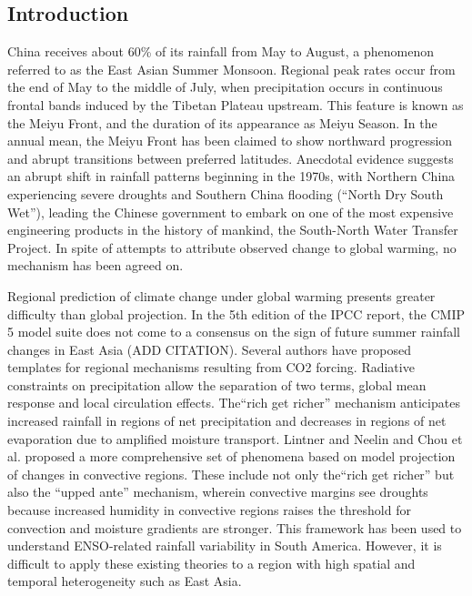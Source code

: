 \documentclass[draft,grl]{AGUTeX}
\begin{document}
\begin{article}



\section{Introduction}
China receives about 60\% of its rainfall from May to August, a phenomenon referred to as the East Asian Summer Monsoon. Regional peak rates occur from the end of May to the middle of July, when precipitation occurs in continuous frontal bands induced by the Tibetan Plateau upstream. This feature is known as the Meiyu Front, and the duration of its appearance as Meiyu Season. In the annual mean, the Meiyu Front has been claimed to show northward progression and abrupt transitions between preferred latitudes\citep{Ding2005}. Anecdotal evidence suggests an abrupt shift in rainfall patterns beginning in the 1970s, with Northern China experiencing severe droughts and Southern China flooding (``North Dry South Wet''), leading the Chinese government to embark on one of the most expensive engineering products in the history of mankind, the South-North Water Transfer Project. In spite of attempts to attribute observed change to global warming, no mechanism has been agreed on.

Regional prediction of climate change under global warming presents greater difficulty than global projection. In the 5th edition of the IPCC report, the CMIP 5 model suite does not come to a consensus on the sign of future summer rainfall changes in East Asia (ADD CITATION). Several authors have proposed templates for regional mechanisms resulting from CO2 forcing. Radiative constraints on precipitation allow the separation of two terms, global mean response and local circulation effects\citep{Muller2011}. The``rich get richer'' mechanism anticipates increased rainfall in regions of net precipitation and decreases in regions of net evaporation due to amplified moisture transport\citep{Held2006}. Lintner and Neelin\citet{Lintner2007} and Chou et al.\citet{Chou2009} proposed a more comprehensive set of phenomena based on model projection of changes in convective regions. These include not only the``rich get richer'' but also the ``upped ante'' mechanism, wherein convective margins see droughts because increased humidity in convective regions raises the threshold for convection and moisture gradients are stronger. This framework has been used to understand ENSO-related rainfall variability in South America. However, it is difficult to apply these existing theories to a region with high spatial and temporal heterogeneity such as East Asia.


\end{article}
\end{document}
